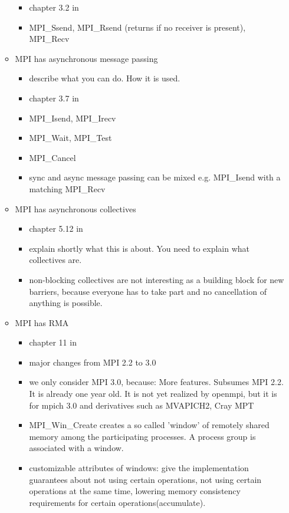\documentclass[a4paper, 10pt]{article}
\begin{document}
\begin{enumerate}
\begin{itemize}
\begin{itemize}
			\item chapter 3.2 in \cite{mpi3}
			\item MPI\_Ssend, MPI\_Rsend (returns if no receiver is present), MPI\_Recv
		\end{itemize}
	\item MPI has asynchronous message passing
		\begin{itemize}
			\item describe what you can do. How it is used.
			\item chapter 3.7 in \cite{mpi3}
			\item MPI\_Isend, MPI\_Irecv
			\item MPI\_Wait, MPI\_Test
			\item MPI\_Cancel
			\item sync and async message passing can be mixed e.g. MPI\_Isend with a matching MPI\_Recv
		\end{itemize}
	\item MPI has asynchronous collectives
		\begin{itemize}
			\item chapter 5.12 in \cite{mpi3}
			\item explain shortly what this is about. You need to explain what collectives are.
			\item non-blocking collectives are not interesting as a building block for new barriers, because everyone has to take part and no cancellation of anything is possible.
		\end{itemize}
	\item MPI has RMA
		\begin{itemize}
			\item chapter 11 in \cite{mpi3}
			\item major changes from MPI 2.2\cite{mpi2} to 3.0\cite{mpi3onesided}
			\item we only consider MPI 3.0, because: More features. Subsumes MPI 2.2. It is already one year old. It is not yet realized by openmpi, but it is for mpich 3.0 and derivatives such as MVAPICH2\cite{mvapich}, Cray MPT\cite{craympt}
			\item MPI\_Win\_Create creates a so called 'window' of remotely shared memory among the participating processes. A process group is associated with a window.
			\item customizable attributes of windows: give the implementation guarantees about not using certain operations, not using certain operations at the same time, lowering memory consistency requirements for certain operations(accumulate).

\end{itemize}
\end{itemize}
\end{enumerate}
\end{document}
